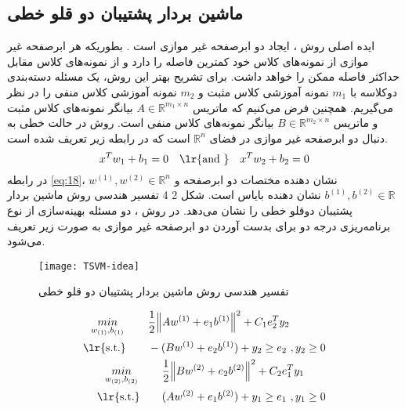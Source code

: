 \subsection{ماشین بردار پشتیبان دو قلو خطی}\label{sec:2:2:1}
ایده اصلی روش ، ایجاد دو ابرصفحه غیر موازی است \cite{jayadeva2007}. بطوریکه هر ابرصفحه غیر موازی از نمونه‌های کلاس خود کمترین فاصله را دارد و از نمونه‌های کلاس مقابل حداکثر فاصله ممکن را خواهد داشت. برای تشریح بهتر این روش، یک مسئله دسته‌بندی دوکلاسه با $m_1$  نمونه آموزشی کلاس مثبت و  $m_2$ نمونه آموزشی کلاس منفی را در نظر می‌گیریم. همچنین فرض می‌کنیم که ماتریس   $A\in {{\mathbb{R}}^{{{m}_{1}}\times n}}$ بیانگر نمونه‌های کلاس مثبت و ماتریس  $B\in {{\mathbb{R}}^{{{m}_{2}}\times n}}$ بیانگر نمونه‌های کلاس منفی است. روش  در حالت خطی به دنبال دو ابرصفحه غیر موازی در فضای  ${{\mathbb{R}}^{n}}$ است که در رابطه زیر تعریف شده است.
\begin{equation}
{{x}^T}{{w}_{1}}+{{b}_{1}}=0 \quad \textrm{\lr{and }} \quad {{x}^T}{{w}_{2}}+{{b}_{2}}=0
\label{eq:18}
\end{equation}
در رابطه \ref{eq:18}،  ${{w}^{(1)}},{{w}^{(2)}}\in {{\mathbb{R}}^{n}}$ نشان دهنده مختصات دو ابرصفحه و  ${{b}^{(1)}},{{b}^{(2)}}\in {\mathbb{R}}$ نشان دهنده بایاس است. شکل ‏2 4 تفسیر هندسی روش ماشین بردار پشتیبان دوقلو خطی را نشان می‌دهد. در روش ، دو مسئله بهینه‌سازی از نوع برنامه‌ریزی درجه دو برای بدست آوردن دو ابرصفحه غیر موازی به صورت زیر تعریف می‌شود.
\begin{figure}[!t]
	\centering
	\texttt{[image: TSVM-idea]}
	\caption{تفسیر هندسی روش ماشین بردار پشتیبان دو قلو خطی}
	\label{fig:TSVM-idea}
\end{figure}
\begin{align}
\label{eq:19}
\begin{split}
\underset{{{w}_{(1)}},{{b}_{(1)}}}{\mathop{min}}\,\qquad  & \frac{1}{2}{{\left\| A{{w}^{(1)}}+{{e}_{1}}{{b}^{(1)}} \right\|}^{2}}+{{C}_{1}}e_{2}^{T}{{y}_{2}}  \\
\text{\lr{s.t.}} \qquad  & -(B{{w}^{(1)}}+{{e}_{2}}{{b}^{(1)}})+{{y}_{2}}\ge {{e}_{2}}\text{ },{{y}_{2}}\ge 0  
\end{split} \\
\label{eq:20}
\begin{split}
\underset{{{w}_{(2)}},{{b}_{(2)}}}{\mathop{min}}\,\qquad  & \frac{1}{2}{{\left\| B{{w}^{(2)}}+{{e}_{2}}{{b}^{(2)}} \right\|}^{2}}+{{C}_{2}}e_{1}^{T}{{y}_{1}}  \\
\text{\lr{s.t.}} \qquad  & (A{{w}^{(2)}}+{{e}_{1}}{{b}^{(2)}})+{{y}_{1}}\ge {{e}_{1}}\text{ },{{y}_{1}}\ge 0  
\end{split}
\end{align}
